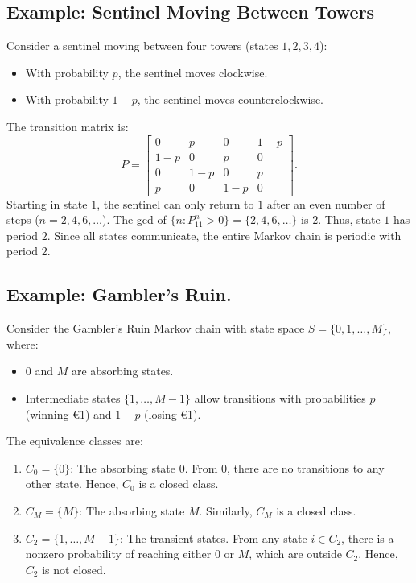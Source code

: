 \subsection{Example: Sentinel Moving Between Towers}  
Consider a sentinel moving between four towers (states \( 1, 2, 3, 4 \)):
\begin{itemize}
    \item With probability \( p \), the sentinel moves clockwise.
    \item With probability \( 1-p \), the sentinel moves counterclockwise.
\end{itemize}
The transition matrix is:
\[
P =
\begin{bmatrix}
0 & p & 0 & 1-p \\
1-p & 0 & p & 0 \\
0 & 1-p & 0 & p \\
p & 0 & 1-p & 0
\end{bmatrix}.
\]
Starting in state \( 1 \), the sentinel can only return to \( 1 \) after an even number of steps (\( n = 2, 4, 6, \dots \)). The gcd of \( \{n : P_{11}^n > 0\} = \{2, 4, 6, \dots\} \) is \( 2 \). Thus, state \( 1 \) has period \( 2 \). Since all states communicate, the entire Markov chain is periodic with period \( 2 \).
\subsection{Example: Gambler’s Ruin.}  
Consider the Gambler’s Ruin Markov chain with state space \( S = \{0, 1, \dots, M\} \), where:
\begin{itemize}
    \item \( 0 \) and \( M \) are absorbing states.
    \item Intermediate states \( \{1, \dots, M-1\} \) allow transitions with probabilities \( p \) (winning €1) and \( 1-p \) (losing €1).
\end{itemize}
The equivalence classes are:  
\begin{enumerate}
    \item \( C_0 = \{0\} \): The absorbing state \( 0 \). From \( 0 \), there are no transitions to any other state. Hence, \( C_0 \) is a closed class.
    \item \( C_M = \{M\} \): The absorbing state \( M \). Similarly, \( C_M \) is a closed class.
    \item \( C_2 = \{1, \dots, M-1\} \): The transient states. From any state \( i \in C_2 \), there is a nonzero probability of reaching either \( 0 \) or \( M \), which are outside \( C_2 \). Hence, \( C_2 \) is not closed.
\end{enumerate}

